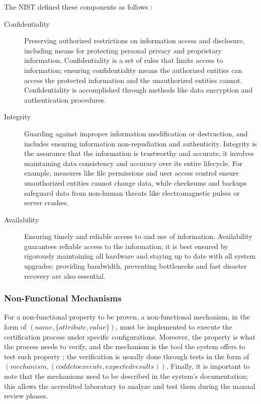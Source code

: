 The NIST defined these components as follows \cite{pub2005minimum}:
\begin{description}
    \item[Confidentiality] Preserving authorized restrictions on information access and disclosure, including means for protecting personal privacy and proprietary information. Confidentiality is a set of rules that limits access to information; ensuring confidentiality means the authorized entities can access the protected information and the unauthorized entities cannot. Confidentiality is accomplished through methods like data encryption and authentication procedures.
    \item[Integrity] Guarding against improper information modification or destruction, and includes ensuring information non-repudiation and authenticity. Integrity is the assurance that the information is trustworthy and accurate; it involves maintaining data consistency and accuracy over its entire lifecycle. For example, measures like file permissions and user access control ensure unauthorized entities cannot change data, while checksums and backups safeguard data from non-human threats like electromagnetic pulses or server crashes.
    \item[Availability] Ensuring timely and reliable access to and use of information. Availability guarantees reliable access to the information; it is best ensured by rigorously maintaining all hardware and staying up to date with all system upgrades; providing bandwidth, preventing bottlenecks and fast disaster recovery are also essential.

\end{description}



\subsubsection{Non-Functional Mechanisms}
For a non-functional property to be proven, a non-functional mechanism, in the form of \( ( name, \{ attribute, value \} )\), must be implemented to execute the certification process under specific configurations. Moreover, the property is what the process needs to verify, and the mechanism is the tool the system offers to test such property \cite{anisetti2017semi}; the verification is usually done through tests in the form of \\ \( (mechanism, (codde to execute, expected results))\). Finally, it is important to note that the mechanisms need to be described in the system's documentation; this allows the accredited laboratory to analyze and test them during the manual review phases.


